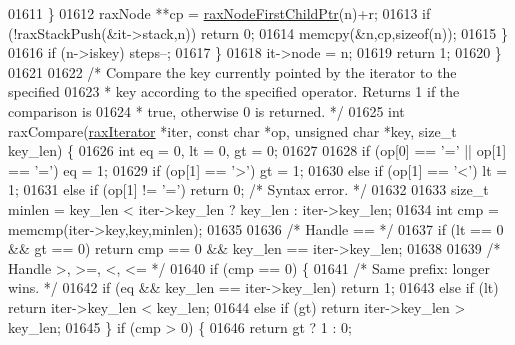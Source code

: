 \begin{DoxyCode}
{{{{{{{{{{{{{{{{{{{{{{{{01611             \}
01612             raxNode **cp = \hyperlink{rax_8c_aa94163a0d02b30219ef18e5a3ea06ca6}{raxNodeFirstChildPtr}(n)+r;
01613             \textcolor{keywordflow}{if} (!raxStackPush(&it->stack,n)) \textcolor{keywordflow}{return} 0;
01614             memcpy(&n,cp,\textcolor{keyword}{sizeof}(n));
01615         \}
01616         \textcolor{keywordflow}{if} (n->iskey) steps--;
01617     \}
01618     it->node = n;
01619     \textcolor{keywordflow}{return} 1;
01620 \}
01621 
01622 \textcolor{comment}{/* Compare the key currently pointed by the iterator to the specified}
01623 \textcolor{comment}{ * key according to the specified operator. Returns 1 if the comparison is}
01624 \textcolor{comment}{ * true, otherwise 0 is returned. */}
01625 \textcolor{keywordtype}{int} raxCompare(\hyperlink{structraxIterator}{raxIterator} *iter, \textcolor{keyword}{const} \textcolor{keywordtype}{char} *op, \textcolor{keywordtype}{unsigned} \textcolor{keywordtype}{char} *key, size\_t key\_len) \{
01626     \textcolor{keywordtype}{int} eq = 0, lt = 0, gt = 0;
01627 
01628     \textcolor{keywordflow}{if} (op[0] == \textcolor{stringliteral}{'='} || op[1] == \textcolor{stringliteral}{'='}) eq = 1;
01629     \textcolor{keywordflow}{if} (op[1] == \textcolor{stringliteral}{'>'}) gt = 1;
01630     \textcolor{keywordflow}{else} \textcolor{keywordflow}{if} (op[1] == \textcolor{stringliteral}{'<'}) lt = 1;
01631     \textcolor{keywordflow}{else} \textcolor{keywordflow}{if} (op[1] != \textcolor{stringliteral}{'='}) \textcolor{keywordflow}{return} 0; \textcolor{comment}{/* Syntax error. */}
01632 
01633     size\_t minlen = key\_len < iter->key\_len ? key\_len : iter->key\_len;
01634     \textcolor{keywordtype}{int} cmp = memcmp(iter->key,key,minlen);
01635 
01636     \textcolor{comment}{/* Handle == */}
01637     \textcolor{keywordflow}{if} (lt == 0 && gt == 0) \textcolor{keywordflow}{return} cmp == 0 && key\_len == iter->key\_len;
01638 
01639     \textcolor{comment}{/* Handle >, >=, <, <= */}
01640     \textcolor{keywordflow}{if} (cmp == 0) \{
01641         \textcolor{comment}{/* Same prefix: longer wins. */}
01642         \textcolor{keywordflow}{if} (eq && key\_len == iter->key\_len) \textcolor{keywordflow}{return} 1;
01643         \textcolor{keywordflow}{else} \textcolor{keywordflow}{if} (lt) \textcolor{keywordflow}{return} iter->key\_len < key\_len;
01644         \textcolor{keywordflow}{else} \textcolor{keywordflow}{if} (gt) \textcolor{keywordflow}{return} iter->key\_len > key\_len;
01645     \} \textcolor{keywordflow}{if} (cmp > 0) \{
01646         \textcolor{keywordflow}{return} gt ? 1 : 0;
}}}}}}}}}}}}}}}}}}}}}}}}
\end{DoxyCode}
